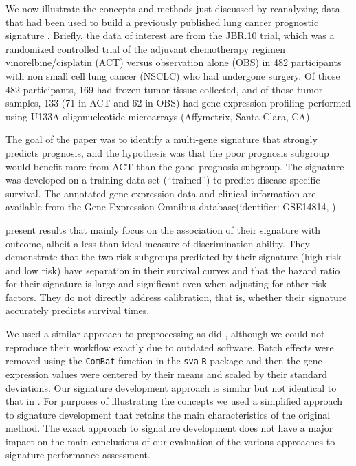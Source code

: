 \documentclass[11pt,]{article}
\begin{document}
We now illustrate the concepts and methods just discussed by reanalyzing
data that had been used to build a previously published lung cancer
prognostic signature \citet{zhu2010prognostic}. Briefly, the data of
interest are from the JBR.10 trial, which was a randomized controlled
trial of the adjuvant chemotherapy regimen vinorelbine/cisplatin (ACT)
versus observation alone (OBS) in 482 participants with non small cell
lung cancer (NSCLC) who had undergone surgery. Of those 482
participants, 169 had frozen tumor tissue collected, and of those tumor
samples, 133 (71 in ACT and 62 in OBS) had gene-expression profiling
performed using U133A oligonucleotide microarrays (Affymetrix, Santa
Clara, CA).

The goal of the \citet{zhu2010prognostic} paper was to identify a
multi-gene signature that strongly predicts prognosis, and the
hypothesis was that the poor prognosis subgroup would benefit more from
ACT than the good prognosis subgroup. The signature was developed on a
training data set (``trained'') to predict disease specific survival.
The annotated gene expression data and clinical information are
available from the Gene Expression Omnibus database(identifier:
GSE14814, \citet{edgar2002gene}).

\citet{zhu2010prognostic} present results that mainly focus on the
association of their signature with outcome, albeit a less than ideal
measure of discrimination ability. They demonstrate that the two risk
subgroups predicted by their signature (high risk and low risk) have
separation in their survival curves and that the hazard ratio for their
signature is large and significant even when adjusting for other risk
factors. They do not directly address calibration, that is, whether
their signature accurately predicts survival times.

We used a similar approach to preprocessing as did
\citet{zhu2010prognostic}, although we could not reproduce their
workflow exactly due to outdated software. Batch effects were removed
using the \texttt{ComBat} function in the \texttt{sva} \texttt{R}
package \citep{leeksva} and then the gene expression values were
centered by their means and scaled by their standard deviations. Our
signature development approach is similar but not identical to that in
\citet{zhu2010prognostic}. For purposes of illustrating the concepts we
used a simplified approach to signature development that retains the
main characteristics of the original method. The exact approach to
signature development does not have a major impact on the main
conclusions of our evaluation of the various approaches to signature
performance assessment.
\end{document}
